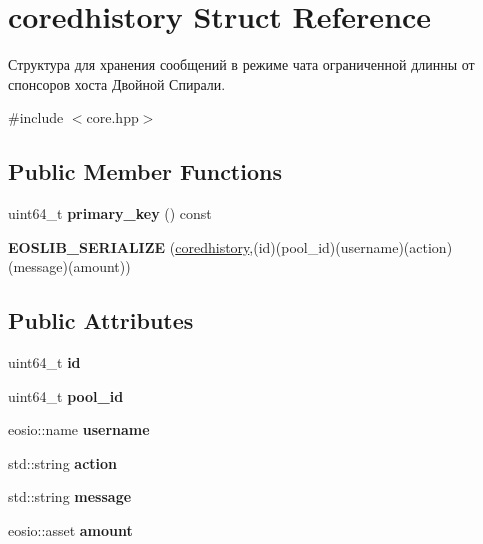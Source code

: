 \hypertarget{structcoredhistory}{}\section{coredhistory Struct Reference}
\label{structcoredhistory}


Структура для хранения сообщений в режиме чата ограниченной длинны от спонсоров хоста Двойной Спирали.  




{\ttfamily \#include $<$core.\+hpp$>$}

\subsection*{Public Member Functions}
\begin{DoxyCompactItemize}
\item 
\mbox{\label{structcoredhistory_a24de1f8333ffcd0a24742c03bb2218ba}} 
uint64\+\_\+t {\bfseries primary\+\_\+key} () const
\item 
\mbox{\label{structcoredhistory_a3238d8500fdc23f1d16513dae4afc7eb}} 
{\bfseries E\+O\+S\+L\+I\+B\+\_\+\+S\+E\+R\+I\+A\+L\+I\+ZE} (\mbox{\hyperlink{structcoredhistory}{coredhistory}},(id)(pool\+\_\+id)(username)(action)(message)(amount))
\end{DoxyCompactItemize}
\subsection*{Public Attributes}
\begin{DoxyCompactItemize}
\item 
\mbox{\label{structcoredhistory_a1ea9f7d117c11540b58739b550f87091}} 
uint64\+\_\+t {\bfseries id}
\item 
\mbox{\label{structcoredhistory_a94bdb8112e0158dd245686615a984781}} 
uint64\+\_\+t {\bfseries pool\+\_\+id}
\item 
\mbox{\label{structcoredhistory_a8bf1a39cea053b8bde6e5aa59c811477}} 
eosio\+::name {\bfseries username}
\item 
\mbox{\label{structcoredhistory_a32396e9e3e997367f5ec62d5b008733d}} 
std\+::string {\bfseries action}
\item 
\mbox{\label{structcoredhistory_a237f39d70f67537ea87e0c773ef0e936}} 
std\+::string {\bfseries message}
\item 
\mbox{\label{structcoredhistory_a0916b76d450651176c2a245879af398a}} 
eosio\+::asset {\bfseries amount}
\end{DoxyCompactItemize}


